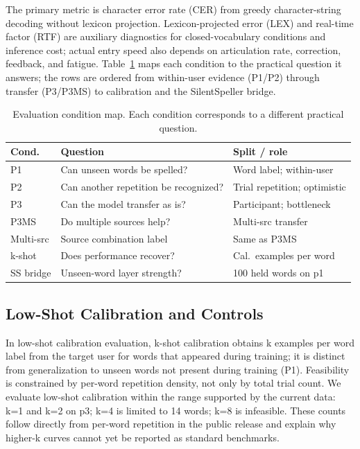 The primary metric is character error rate (CER) from greedy character-string decoding without lexicon projection.
Lexicon-projected error (LEX) and real-time factor (RTF) are auxiliary diagnostics for closed-vocabulary conditions and inference cost; actual entry speed also depends on articulation rate, correction, feedback, and fatigue.
Table~\ref{tab:protocol_map} maps each condition to the practical question it answers; the rows are ordered from within-user evidence (P1/P2) through transfer (P3/P3MS) to calibration and the SilentSpeller bridge.

\begin{table}[!b]
\centering
\caption{Evaluation condition map. Each condition corresponds to a different practical question.}
\label{tab:protocol_map}
\setlength{\tabcolsep}{2pt}
\begin{tabular}{@{}p{}p{}p{}@{}}
\toprule
Cond. & Question & Split / role \\
\midrule
P1 & Can unseen words be spelled? & Word label; within-user \\
P2 & Can another repetition be recognized? & Trial repetition; optimistic \\
P3 & Can the model transfer as is? & Participant; bottleneck \\
P3MS & Do multiple sources help? & Multi-src transfer \\
Multi-src & Source combination label & Same as P3MS \\
k-shot & Does performance recover? & Cal.\ examples per word \\
SS bridge & Unseen-word layer strength? & 100 held words on p1 \\
\bottomrule
\end{tabular}
\end{table}

\subsection{Low-Shot Calibration and Controls}

In low-shot calibration evaluation, k-shot calibration obtains k examples per word label from the target user for words that appeared during training; it is distinct from generalization to unseen words not present during training (P1).
Feasibility is constrained by per-word repetition density, not only by total trial count.
We evaluate low-shot calibration within the range supported by the current data: k=1 and k=2 on p3; k=4 is limited to 14 words; k=8 is infeasible.
These counts follow directly from per-word repetition in the public release and explain why higher-k curves cannot yet be reported as standard benchmarks.

